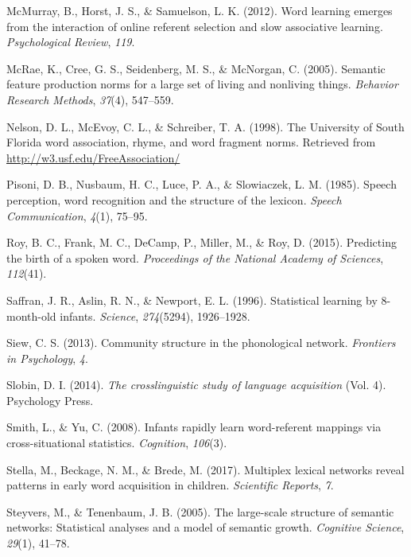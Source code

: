 \documentclass[english,,man,floatsintext]{apa6}
\begin{document}
\leavevmode\hypertarget{ref-mcmurray2012}{}%
McMurray, B., Horst, J. S., \& Samuelson, L. K. (2012). Word learning emerges from the interaction of online referent selection and slow associative learning. \emph{Psychological Review}, \emph{119}.

\leavevmode\hypertarget{ref-mcrae2005}{}%
McRae, K., Cree, G. S., Seidenberg, M. S., \& McNorgan, C. (2005). Semantic feature production norms for a large set of living and nonliving things. \emph{Behavior Research Methods}, \emph{37}(4), 547--559.

\leavevmode\hypertarget{ref-nelson1998}{}%
Nelson, D. L., McEvoy, C. L., \& Schreiber, T. A. (1998). The University of South Florida word association, rhyme, and word fragment norms. Retrieved from \url{http://w3.usf.edu/FreeAssociation/}

\leavevmode\hypertarget{ref-pisoni1985}{}%
Pisoni, D. B., Nusbaum, H. C., Luce, P. A., \& Slowiaczek, L. M. (1985). Speech perception, word recognition and the structure of the lexicon. \emph{Speech Communication}, \emph{4}(1), 75--95.

\leavevmode\hypertarget{ref-roy2015}{}%
Roy, B. C., Frank, M. C., DeCamp, P., Miller, M., \& Roy, D. (2015). Predicting the birth of a spoken word. \emph{Proceedings of the National Academy of Sciences}, \emph{112}(41).

\leavevmode\hypertarget{ref-saffran1996}{}%
Saffran, J. R., Aslin, R. N., \& Newport, E. L. (1996). Statistical learning by 8-month-old infants. \emph{Science}, \emph{274}(5294), 1926--1928.

\leavevmode\hypertarget{ref-siew2013}{}%
Siew, C. S. (2013). Community structure in the phonological network. \emph{Frontiers in Psychology}, \emph{4}.

\leavevmode\hypertarget{ref-slobin2014}{}%
Slobin, D. I. (2014). \emph{The crosslinguistic study of language acquisition} (Vol. 4). Psychology Press.

\leavevmode\hypertarget{ref-smith2008}{}%
Smith, L., \& Yu, C. (2008). Infants rapidly learn word-referent mappings via cross-situational statistics. \emph{Cognition}, \emph{106}(3).

\leavevmode\hypertarget{ref-stella2017}{}%
Stella, M., Beckage, N. M., \& Brede, M. (2017). Multiplex lexical networks reveal patterns in early word acquisition in children. \emph{Scientific Reports}, \emph{7}.

\leavevmode\hypertarget{ref-steyvers2005}{}%
Steyvers, M., \& Tenenbaum, J. B. (2005). The large-scale structure of semantic networks: Statistical analyses and a model of semantic growth. \emph{Cognitive Science}, \emph{29}(1), 41--78.
\end{document}
